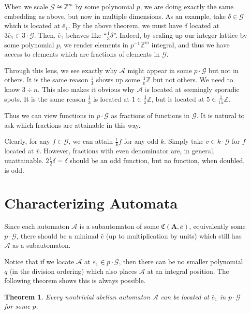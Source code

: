 \documentclass[runningheads]{llncs}
\newcommand{\A}{\mathcal{A}}
\newcommand{\G}{\mathcal{G}}
\newcommand{\C}{\mathfrak{C}(\Am,\e)}
\newcommand{\Z}{\mathbb{Z}}
\newcommand{\2}{\textbf{2}}
\newcommand{\Am}{\textbf{A}}
\newcommand{\vv}{\bar{v}}
\newcommand{\e}{\bar{e}}
\newtheorem{thm}{Theorem}
\begin{document}
When we scale $\G \cong \Z^m$ by some polynomial $p$, we are doing exactly
the same embedding as above, but now in multiple dimensions. As an example,
take $\delta \in \G$ which is located at $\e_1$. By the above theorem, we
must have $\delta$ located at $3 \e_1 \in 3 \cdot \G$. Then, $\e_1$ behaves 
like ``$\frac{1}{3} \delta$''. Indeed, by scaling up our integer lattice 
by some polynomial $p$, we render elements in $p^{-1} \Z^m$ integral,
and thus we have access to elements which are fractions of elements in $\G$.

Through this lens, we see exactly why $\A$ might appear in some $p \cdot \G$
but not in others. It is the same reason $\frac{1}{3}$ shows up some
$\frac{1}{n} \Z$ but not others. We need to know $3 \div n$. This also makes it
obvious why $\A$ is located at seemingly sporadic spots. It is the same reason
$\frac{1}{3}$ is located at $1 \in \frac{1}{3} \Z$, but is located at 
$5 \in \frac{1}{15} \Z$. 

Thus we can view functions in $p \cdot \G$ as fractions of functions in $\G$.
It is natural to ask which fractions are attainable in this way.

Clearly, for any $f \in \G$, we can attain $\frac{1}{k} f$ for any odd $k$.
Simply take $\vv \in k \cdot \G$ for $f$ located at $\vv$.
However, fractions with even denominator are, in general, unattainable.
$2 \frac{1}{2}\delta = \delta$ should be an odd function,
but no function, when doubled, is odd.

\section{Characterizing Automata}
Since each automaton $\A$ is a subautomaton of some $\C$,
equivalently some $p \cdot \G$, there should be a minimal $\e$ 
(up to multiplication by units) which still has $\A$ as a subautomaton. 

Notice that if we locate $\A$ at $\e_1 \in p \cdot \G$, 
then there can be no smaller polynomial $q$ (in the division ordering)
which also places $\A$ at an integral position. The following theorem 
shows this is always possible.

\begin{thm}
  Every nontrivial abelian automaton $\A$ can be 
  located at $\e_1$ in $p \cdot \G$ for some $p$.
\end{thm}
\end{document}
